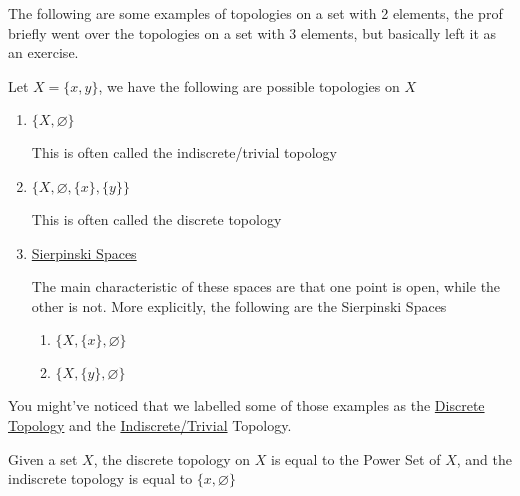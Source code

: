 The following are some examples of topologies on a set with 2 elements, the prof briefly went over the topologies on a set with 3 elements, but basically left it as an exercise.
\begin{example}
    Let $X=\{x,y\}$, we have the following are possible topologies on $X$
    \begin{enumerate}
        \item $\{X,\varnothing\}$
        
        This is often called the indiscrete/trivial topology
        \item $\{X,\varnothing,\{x\},\{y\}\}$
        
        This is often called the discrete topology

        \item\href{https://en.wikipedia.org/wiki/Sierpi%C5%84ski_space}{Sierpinski Spaces}
        
        The main characteristic of these spaces are that one point is open, while the other is not. More explicitly, the following are the Sierpinski Spaces
        \begin{enumerate}
            \item $\{X,\{x\},\varnothing\}$
            \item $\{X,\{y\},\varnothing\}$
        \end{enumerate}
    \end{enumerate}
\end{example}
    You might've noticed that we labelled some of those examples as the \href{https://en.wikipedia.org/wiki/Discrete_space#:~:text=The%20discrete%20topology%20is%20the,set%20in%20the%20discrete%20topology.}{Discrete Topology} and the \href{https://en.wikipedia.org/wiki/Trivial_topology}{Indiscrete/Trivial} Topology.
\begin{definition}
    Given a set $X$, the discrete topology on $X$ is equal to the Power Set of $X$, and the indiscrete topology is equal to $\{x,\varnothing\}$
\end{definition}
    
